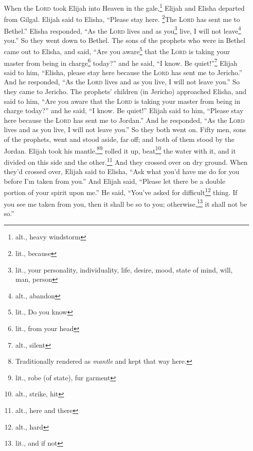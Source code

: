 
\begin{inparaenum}
     When the \textsc{Lord} took Elijah into Heaven in the gale,\footnote{alt., heavy windstorm} Elijah and Elisha departed from Gilgal.%
     Elijah said to Elisha, ``Please stay here. \footnote{lit., because}The \textsc{Lord} has sent me to Bethel.'' Elisha responded, ``As the \textsc{Lord} lives and as you\footnote{lit., your personality, individuality, life, desire, mood, state of mind, will, man, person} live, I will not leave\footnote{alt., abandon} you.'' So they went down to Bethel.%
     The sons of the prophets who were in Bethel came out to Elisha, and said, ``Are you aware\footnote{lit., Do you know} that the \textsc{Lord} is taking your master from being in charge\footnote{lit., from your head} today?'' and he said, ``I know. Be quiet!''\footnote{alt., silent}%
     Elijah said to him, ``Elisha, please stay here because the \textsc{Lord} has sent me to Jericho.'' And he responded, ``As the \textsc{Lord} lives and as you live, I will not leave you.'' So they came to Jericho.%
     The prophets' children (in Jericho) approached Elisha, and said to him, ``Are you aware that the \textsc{Lord} is taking your master from being in charge today?'' and he said, ``I know. Be quiet!''%
     Elijah said to him, ``Please stay here because the \textsc{Lord} has sent me to Jordan.'' And he responded, ``As the \textsc{Lord} lives and as you live, I will not leave you.'' So they both went on.%
     Fifty men, sons of the prophets, went and stood aside, far off; and both of them stood by the Jordan.%
     Elijah took his mantle,\footnote{Traditionally rendered as \textit{mantle} and kept that way here.}\footnote{lit., robe (of state), fur garment} rolled it up, beat\footnote{alt., strike, hit} the water with it, and it divided on this side and the other.\footnote{alt., here and there} And they crossed over on dry ground.%
     When they'd crossed over, Elijah said to Elisha, ``Ask what you'd have me do for you before I'm taken from you.'' And Elijah said, ``Please let there be a double portion of your spirit upon me.''%
     He said, ``You've asked for difficult\footnote{alt., hard} thing. If you see me taken from you, then it shall be so to you; otherwise,\footnote{lit., and if not} it shall not be so.''%

\end{inparaenum}

